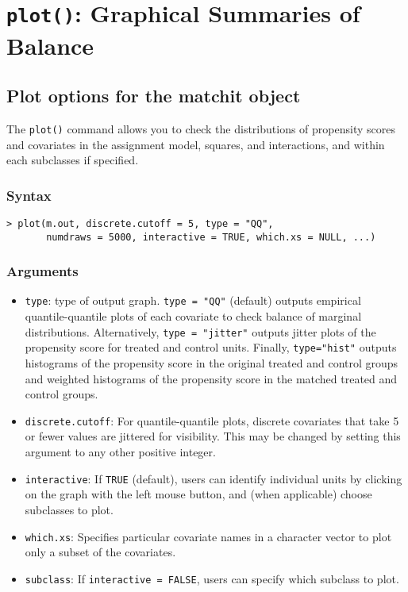 \section{\texttt{plot()}: Graphical Summaries of Balance}


\subsection{Plot options for the matchit object}
The \texttt{plot()} command allows you to check the distributions of
propensity scores and covariates in the assignment model, squares, and
interactions, and within each subclasses if specified.

\subsubsection{Syntax}

\begin{verbatim}
> plot(m.out, discrete.cutoff = 5, type = "QQ", 
       numdraws = 5000, interactive = TRUE, which.xs = NULL, ...)
\end{verbatim}

\subsubsection{Arguments}

\begin{itemize}
\item {\tt type}: type of output graph. \texttt{type = "QQ"}
  (default) outputs empirical quantile-quantile plots of each
  covariate to check balance of marginal distributions. Alternatively,
  \texttt{type = "jitter"} outputs jitter plots of the propensity
  score for treated and control units.  Finally, \texttt{type="hist"} outputs  
  histograms of the propensity score in the original treated and control groups
  and weighted histograms of the propensity score in the matched treated and control groups.
  
\item {\tt discrete.cutoff}: For quantile-quantile plots, discrete
  covariates that take 5 or fewer values are jittered for visibility.
  This may be changed by setting this argument to any other positive
  integer.
  
\item {\tt interactive}: If \texttt{TRUE} (default), users can
  identify individual units by clicking on the graph with the left
  mouse button, and (when applicable) choose subclasses to plot.
  
\item {\tt which.xs}: Specifies particular covariate names in a
  character vector to plot only a subset of the covariates.

\item {\tt subclass}: If \texttt{interactive = FALSE}, users can
  specify which subclass to plot. 

\end{itemize}

